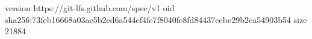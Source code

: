 version https://git-lfs.github.com/spec/v1
oid sha256:73feb16668a03ae5b2ed6a544ef4fc7f8040fe8fd84437cebe29b2ea54903b54
size 21884
